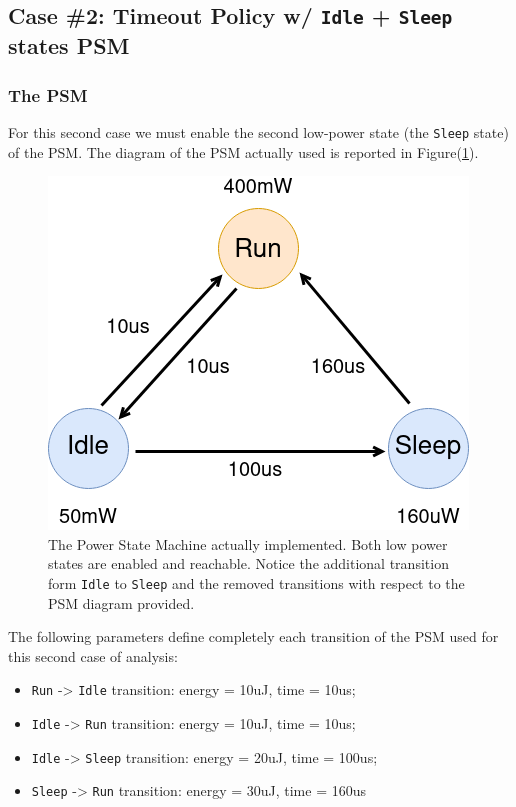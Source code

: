 \documentclass[a4paper]{article}
\begin{document}
    \subsection{Case \#2: Timeout Policy w/ \texttt{Idle} + \texttt{Sleep} states PSM}
        \subsubsection{The PSM}
            For this second case we must enable the second low-power state (the \texttt{Sleep} state) of the PSM.
            The diagram of the PSM actually used is reported in Figure(\ref{fig:PSM_case3}).

            \begin{figure}[htp]
                \centering
                \includegraphics[width=0.35 \columnwidth]{./screenshots/PSM_case3.png}
                \caption{
                        \label{fig:PSM_case3}
                        The Power State Machine actually implemented. Both low power states are enabled and reachable. Notice the additional transition form \texttt{Idle} to \texttt{Sleep} and the removed transitions with respect to the PSM diagram provided.
                }
            \end{figure}


            The following parameters define completely each transition of the PSM used for this second case of analysis:
            \begin{itemize}
                \item \texttt{Run} -> \texttt{Idle} transition: energy  = 10uJ, time = 10us;
                \item \texttt{Idle} -> \texttt{Run} transition: energy  = 10uJ, time = 10us;
                \item \texttt{Idle} -> \texttt{Sleep} transition: energy  = 20uJ, time = 100us;
                \item \texttt{Sleep} -> \texttt{Run} transition: energy  = 30uJ, time = 160us
            \end{itemize}
\end{document}
